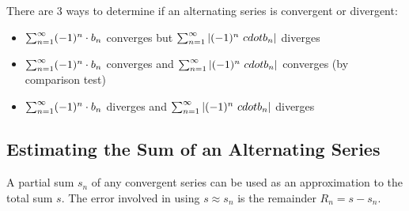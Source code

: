 
There are 3 ways to determine if an alternating series is convergent or divergent:
\begin{itemize}
  \item \(\sum_{n=1}^{\infty} (-1)^n \cdot b_n\) converges but \(\sum_{n=1}^{\infty} |(-1)^n\ cdot b_n|\) diverges
  \item \(\sum_{n=1}^{\infty} (-1)^n \cdot b_n\) converges and \(\sum_{n=1}^{\infty} |(-1)^n\ cdot b_n|\) converges (by comparison test)
  \item \(\sum_{n=1}^{\infty} (-1)^n \cdot b_n\) diverges and \(\sum_{n=1}^{\infty} |(-1)^n\ cdot b_n|\) diverges
\end{itemize}

\subsection{Estimating the Sum of an Alternating Series}

A partial sum $s_n$ of any convergent series can be used as an approximation to the total sum $s$. The error involved in using $s \approx s_n$ is the remainder $R_n = s - s_n$.

